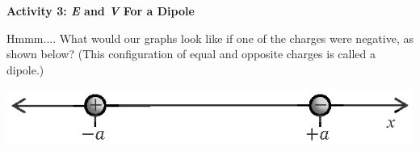 
\pagebreak[3]
\textbf{Activity 3: \textit{E} and \textit{V} For a Dipole}

Hmmm.... What would our graphs look like if one of the charges were negative, as shown below?  (This configuration of equal and opposite charges is called a dipole.)
\begin{center}
\includegraphics{potential_superposition/activity_2_3_figs/charges_on_x_axis_dipole.eps}
\end{center}

